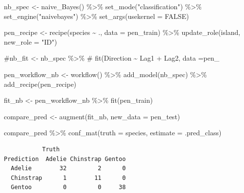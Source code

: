 \documentclass[
  letterpaper,
  DIV=11,
  numbers=noendperiod]{scrreprt}
\newenvironment{Shaded}{\begin{snugshade}}{\end{snugshade}}
\newcommand{\AttributeTok}[1]{\textcolor[rgb]{0.40,0.45,0.13}{#1}}
\newcommand{\CommentTok}[1]{\textcolor[rgb]{0.37,0.37,0.37}{#1}}
\newcommand{\ConstantTok}[1]{\textcolor[rgb]{0.56,0.35,0.01}{#1}}
\newcommand{\FunctionTok}[1]{\textcolor[rgb]{0.28,0.35,0.67}{#1}}
\newcommand{\NormalTok}[1]{\textcolor[rgb]{0.00,0.23,0.31}{#1}}
\newcommand{\OtherTok}[1]{\textcolor[rgb]{0.00,0.23,0.31}{#1}}
\newcommand{\SpecialCharTok}[1]{\textcolor[rgb]{0.37,0.37,0.37}{#1}}
\newcommand{\StringTok}[1]{\textcolor[rgb]{0.13,0.47,0.30}{#1}}
\begin{document}
\begin{Shaded}
\begin{Highlighting}[]
\NormalTok{nb\_spec }\OtherTok{\textless{}{-}} \FunctionTok{naive\_Bayes}\NormalTok{() }\SpecialCharTok{\%\textgreater{}\%} 
  \FunctionTok{set\_mode}\NormalTok{(}\StringTok{"classification"}\NormalTok{) }\SpecialCharTok{\%\textgreater{}\%} 
  \FunctionTok{set\_engine}\NormalTok{(}\StringTok{"naivebayes"}\NormalTok{) }\SpecialCharTok{\%\textgreater{}\%} 
  \FunctionTok{set\_args}\NormalTok{(}\AttributeTok{usekernel =} \ConstantTok{FALSE}\NormalTok{)  }


\NormalTok{pen\_recipe }\OtherTok{\textless{}{-}} 
  \FunctionTok{recipe}\NormalTok{(species }\SpecialCharTok{\textasciitilde{}}\NormalTok{ ., }\AttributeTok{data =}\NormalTok{ pen\_train) }\SpecialCharTok{\%\textgreater{}\%} 
  \FunctionTok{update\_role}\NormalTok{(island,  }\AttributeTok{new\_role =} \StringTok{"ID"}\NormalTok{)}


\CommentTok{\#nb\_fit \textless{}{-} nb\_spec \%\textgreater{}\% }
\CommentTok{\#  fit(Direction \textasciitilde{} Lag1 + Lag2, data =pen\_}

\NormalTok{pen\_workflow\_nb }\OtherTok{\textless{}{-}} \FunctionTok{workflow}\NormalTok{() }\SpecialCharTok{\%\textgreater{}\%}
  \FunctionTok{add\_model}\NormalTok{(nb\_spec) }\SpecialCharTok{\%\textgreater{}\%}
  \FunctionTok{add\_recipe}\NormalTok{(pen\_recipe)}

\NormalTok{fit\_nb }\OtherTok{\textless{}{-}}\NormalTok{ pen\_workflow\_nb }\SpecialCharTok{\%\textgreater{}\%} \FunctionTok{fit}\NormalTok{(pen\_train)}
\end{Highlighting}
\end{Shaded}

\begin{Shaded}
\begin{Highlighting}[]
\NormalTok{compare\_pred }\OtherTok{\textless{}{-}} \FunctionTok{augment}\NormalTok{(fit\_nb, }\AttributeTok{new\_data =}\NormalTok{ pen\_test) }

\NormalTok{compare\_pred }\SpecialCharTok{\%\textgreater{}\%} \FunctionTok{conf\_mat}\NormalTok{(}\AttributeTok{truth =}\NormalTok{ species, }\AttributeTok{estimate =}\NormalTok{ .pred\_class)}
\end{Highlighting}
\end{Shaded}

\begin{verbatim}
           Truth
Prediction  Adelie Chinstrap Gentoo
  Adelie        32         2      0
  Chinstrap      1        11      0
  Gentoo         0         0     38
\end{verbatim}
\end{document}

